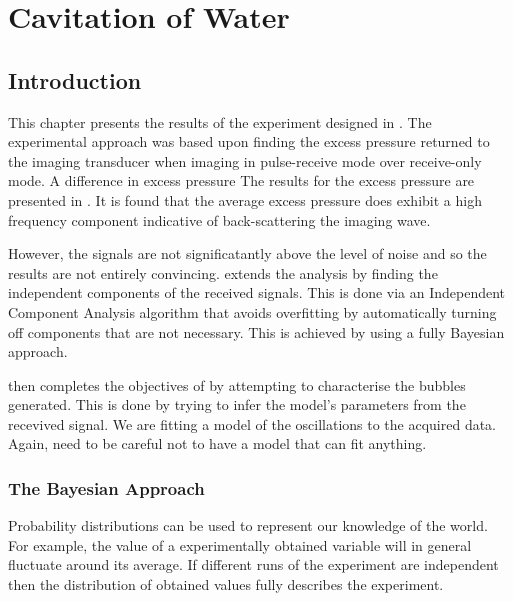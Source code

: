 


\chapter{Cavitation of Water}\label{ch:water_cavitation}



\section{Introduction}

This chapter presents the results of the experiment designed in .
The experimental approach was based upon finding the excess pressure
returned to the imaging transducer when imaging in pulse-receive mode
over receive-only mode. 
A difference in excess pressure 
The results for the excess pressure are presented in .
It is found that the average excess pressure 
does exhibit a high frequency component indicative of back-scattering the imaging wave.

However, the signals are not significatantly above the level of noise
and so the results are not entirely convincing.
  extends the analysis by finding the independent components of the 
received signals.
This is done via an Independent Component Analysis algorithm
that avoids overfitting by automatically turning off components that are not necessary.
This is achieved by using a fully Bayesian approach.
 

 then completes the objectives of 
by attempting to characterise the bubbles generated.
This is done by trying to infer the model's parameters from the recevived signal.
We are fitting a model of the oscillations to the acquired data.
Again, need to be careful not to have a model that can fit anything.

\subsection{The Bayesian Approach}
Probability distributions can be used to represent our knowledge of the world.
For example, the value of a  experimentally obtained variable will in general
fluctuate around its average.  
If different runs of the experiment are independent
then the  distribution of obtained values fully describes the experiment.

